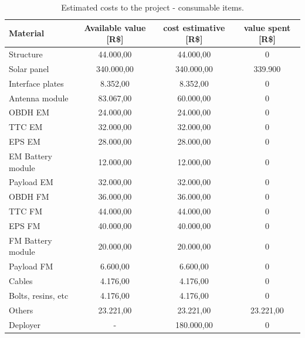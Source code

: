 \begin{table}[H]
    \centering
    \begin{tabular}{lccc}
        \toprule[1.5pt]
        \textbf{Material} & \textbf{Available value [R\$]} & \textbf{cost estimative [R\$]} & \textbf{value spent [R\$]} \\
        \midrule
        Structure          & 44.000,00  & 44.000,00  & 0 \\
        Solar panel        & 340.000,00 & 340.000,00 & 339.900 \\
        Interface plates   & 8.352,00   & 8.352,00   & 0 \\
        Antenna module     & 83.067,00  & 60.000,00  & 0 \\
        \acs{OBDH} EM      & 24.000,00  & 24.000,00  & 0 \\
        \acs{TTC} EM       & 32.000,00  & 32.000,00  & 0 \\
        \acs{EPS} EM       & 28.000,00  & 28.000,00  & 0 \\
        EM Battery module  & 12.000,00  & 12.000,00  & 0 \\
        Payload EM         & 32.000,00  & 32.000,00  & 0 \\
        \acs{OBDH} FM      & 36.000,00  & 36.000,00  & 0 \\
        \acs{TTC} FM       & 44.000,00  & 44.000,00  & 0 \\
        \acs{EPS} FM       & 40.000,00  & 40.000,00  & 0 \\
        FM Battery module  & 20.000,00  & 20.000,00  & 0 \\
        Payload FM         & 6.600,00   & 6.600,00   & 0 \\
        Cables             & 4.176,00   & 4.176,00   & 0 \\
        Bolts, resins, etc & 4.176,00   & 4.176,00   & 0 \\
        Others             & 23.221,00  & 23.221,00  & 23.221,00 \\
        Deployer           & -          & 180.000,00 & 0 \\
        \bottomrule[1.5pt]
    \end{tabular}
    \caption{Estimated costs to the project - consumable items.}
    \label{tabela_cost3}
\end{table}

